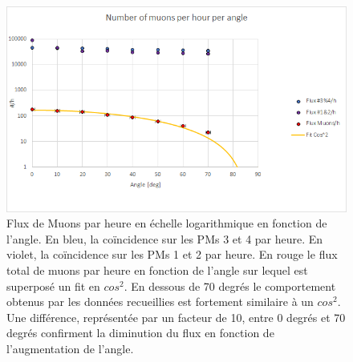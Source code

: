 \documentclass[12pt]{article}
\begin{document}
\begin{figure}[!htbp]
    \centering
    \includegraphics[width=\textwidth]{graphiques/experience2/NumberMuonsPerHourPerAngle.png}
    \caption{Flux de Muons par heure en échelle logarithmique en fonction de l'angle. En bleu, la coïncidence sur les PMs 3 et 4 par heure. En violet, la coïncidence sur les PMs 1 et 2 par heure. En rouge le flux total de muons par heure en fonction de l'angle sur lequel est superposé un fit en $cos^2$. En dessous de 70 degrés le comportement obtenus par les données recueillies est fortement similaire à un $cos^2$. Une différence, représentée par un facteur de 10, entre 0 degrés et 70 degrés confirment la diminution du flux en fonction de l'augmentation de l'angle.}
    \label{fig:NumberMuonsPerHourPerAngle}
\end{figure}
\end{document}
